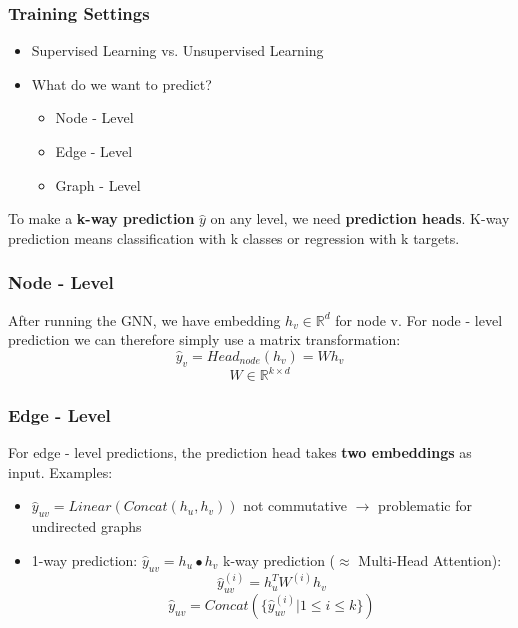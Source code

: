 \documentclass[parskip=full]{scrartcl}
\begin{document}
\subsubsection{Training Settings}
\begin{itemize}
	\item Supervised Learning vs. Unsupervised Learning
	\item What do we want to predict?
	\begin{itemize}
		\item Node - Level
		\item Edge - Level
		\item Graph - Level
	\end{itemize}
\end{itemize}

To make a \textbf{k-way prediction} $\hat{y}$ on any level, we need \textbf{prediction heads}. K-way prediction means classification with k classes or regression with k targets.

\subsubsection{Node - Level}
After running the GNN, we have embedding $h_v \in \mathbb{R}^d$ for node v. For node - level prediction we can therefore simply use a matrix transformation:
\[\hat{y}_v = Head_{node}(h_v) = Wh_v\]
\[W \in \mathbb{R}^{k \times d}\]

\subsubsection{Edge - Level}
For edge - level predictions, the prediction head takes \textbf{two embeddings} as input. \newline
Examples:
\begin{itemize}
	\item $\hat{y}_{uv} = Linear(Concat(h_u, h_v))$ \newline
		not commutative $\rightarrow$ problematic for undirected graphs
	\item 1-way prediction: $\hat{y}_{uv} = h_u \bullet h_v$ \newline
		k-way prediction ($\approx$ Multi-Head Attention):
		\[\hat{y}_{uv}^{(i)} = h_u^TW^{(i)}h_v\]
		\[\hat{y}_{uv} = Concat(\{\hat{y}_{uv}^{(i)} | 1 \leqslant i \leqslant k\})\]
\end{itemize}
\end{document}
